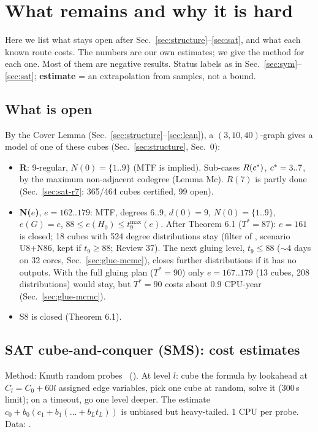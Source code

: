 \section{What remains and why it is hard}\label{sec:hard}

Here we list what stays open after Sec.~\ref{sec:structure}--\ref{sec:sat}, and what each known route costs. The numbers are our own
estimates; we give the method for each one. Most of them are negative results. Status labels as in Sec.~\ref{sec:sym}--\ref{sec:sat};
\textbf{estimate} = an extrapolation from samples, not a bound.

\subsection{What is open}\label{sec:hard-open}
By the Cover Lemma (Sec.~\ref{sec:structure}--\ref{sec:lean}), a $(3,10,40)$-graph gives a model of one of these cubes (Sec.~\ref{sec:structure},  Sec.~0):
\begin{itemize}
\item \textbf{R}: 9-regular, $N(0) = \{1..9\}$ (MTF is implied). Sub-cases $R(c^{*})$, $c^{*} = 3..7$, by the maximum non-adjacent
  codegree (Lemma Mc). $R(7)$ is partly done (Sec.~\ref{sec:sat-r7}: 365/464 cubes certified, 99 open).
\item \textbf{N($e$)}, $e = 162..179$: MTF, degrees $6..9$, $d(0) = 9$, $N(0) = \{1..9\}$, $e(G) = e$, $88 \le e(H_0) \le t_9^{\max}(e)$.
  After Theorem 6.1 ($T^* = 87$): $e = 161$ is closed; 18 cubes with 524 degree distributions stay (filter of
  , scenario U8+N86, kept if $t_9 \ge 88$; Review 37). The next gluing level, $t_9 \le 88$ (${\sim}4$ days on 32 cores, Sec.~\ref{sec:glue-mcmc}),
  closes further distributions if it has no outputs. With the full gluing plan ($T^* = 90$) only $e = 167..179$ (13 cubes,
  208 distributions) would stay, but $T^* = 90$ costs about 0.9 CPU-year (Sec.~\ref{sec:glue-mcmc}).
\item S8 is closed (Theorem 6.1).
\end{itemize}

\subsection{SAT cube-and-conquer (SMS): cost estimates}\label{sec:hard-sms}
Method: Knuth random probes~\cite{Knuth75} (). At level $l$: cube the formula by lookahead at $C_l = C_0 + 60 l$
assigned edge variables, pick one cube at random, solve it (300\,s limit); on a timeout, go one level deeper.
The estimate $c_0 + b_0 (c_1 + b_1 (\dots + b_L t_L))$ is unbiased but heavy-tailed. 1 CPU per probe. Data:
.

